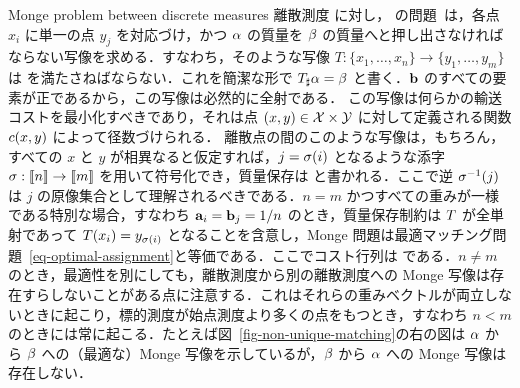\begin{rem1}{Monge problem between discrete measures}\label{rem-monge1}
離散測度
に対し，\citeauthor{Monge1781} の問題~\citeyearpar{Monge1781}は，各点 $x_i$ に単一の点 $y_j$ を対応づけ，かつ $\alpha$ の質量を $\beta$ の質量へと押し出さなければならない写像を求める．すなわち，そのような写像 $T:\{x_1,\dots, x_n\}\rightarrow \{y_1,\dots,y_m\}$ は
を満たさねばならない．これを簡潔な形で $T_\sharp \alpha = \beta$ と書く．$\mathrm{\textbf{b}}$ のすべての要素が正であるから，この写像は必然的に全射である．
%
この写像は何らかの輸送コストを最小化すべきであり，それは点 $(x,y) \in \mathcal{X} \times \mathcal{Y}$ に対して定義される関数 $c(x,y)$ によって径数づけられる．
離散点の間のこのような写像は，もちろん，すべての $x$ と $y$ が相異なると仮定すれば，$j=\sigma(i)$ となるような添字 $\sigma : \llbracket n\rrbracket \rightarrow \llbracket m\rrbracket$ を用いて符号化でき，質量保存は
と書かれる．ここで逆 $\sigma^{-1}(j)$ は $j$ の原像集合として理解されるべきである．$n=m$ かつすべての重みが一様である特別な場合，すなわち $\mathrm{\textbf{a}}_i=\mathrm{\textbf{b}}_j=1/n$ のとき，質量保存制約は $T$ が全単射であって $T(x_i)=y_{\sigma(i)}$ となることを含意し，Monge 問題は最適マッチング問題~\eqref{eq-optimal-assignment}と等価である．ここでコスト行列は
である．$n\ne m$ のとき，最適性を別にしても，離散測度から別の離散測度への Monge 写像は存在すらしないことがある点に注意する．これはそれらの重みベクトルが両立しないときに起こり，標的測度が始点測度より多くの点をもつとき，すなわち $n<m$ のときには常に起こる．たとえば図~\ref{fig-non-unique-matching}の右の図は $\alpha$ から $\beta$ への（最適な）Monge 写像を示しているが，$\beta$ から $\alpha$ への Monge 写像は存在しない．
\end{rem1}


